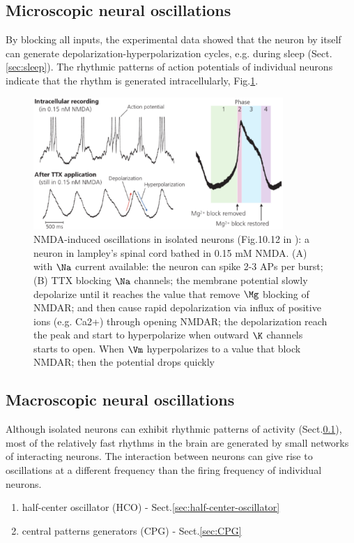 \subsection{Microscopic neural oscillations}
\label{sec:rhythmic-activity-isolated-neuron}

By blocking all inputs, the experimental data showed that the neuron by itself
can generate depolarization-hyperpolarization cycles, e.g. during sleep
(Sect.\ref{sec:sleep}).
The rhythmic patterns of action potentials of individual neurons indicate that the rhythm is generated
intracellularly, Fig.\ref{fig:spontaneous-firing-spinal-coord-neuron}.

\begin{figure}[hbt]
  \centerline{\includegraphics[height=5cm,
    angle=0]{./images/spontaneous-firing-spinal-coord-neuron.eps}}
\caption{NMDA-induced oscillations in isolated neurons (Fig.10.12 in
\citep{striedter2015}): a neuron in lampley's spinal cord bathed in 0.15 mM
NMDA. (A) with $\Na$ current available: the neuron can spike 2-3 APs per burst;
(B) TTX blocking $\Na$ channels; the membrane potential slowly depolarize until
it reaches the value that remove $\Mg$ blocking of NMDAR; and then cause rapid
depolarization via influx of positive ions (e.g. Ca2+) through opening NMDAR;
the depolarization reach the peak and start to hyperpolarize when outward $\K$
channels starts to open. When $\Vm$ hyperpolarizes to a value that block NMDAR;
then the potential drops quickly}
\label{fig:spontaneous-firing-spinal-coord-neuron}
\end{figure}


\subsection{Macroscopic neural oscillations}

Although isolated neurons can exhibit rhythmic patterns of activity
(Sect.\ref{sec:rhythmic-activity-isolated-neuron}), most of the relatively fast
rhythms in the brain are generated by small networks of interacting neurons.
The interaction between neurons can give rise to oscillations at a different
frequency than the firing frequency of individual neurons.
\begin{enumerate}
  \item half-center oscillator (HCO) - Sect.\ref{sec:half-center-oscillator}
  \item central patterns generators  (CPG) - Sect.\ref{sec:CPG}
\end{enumerate}


